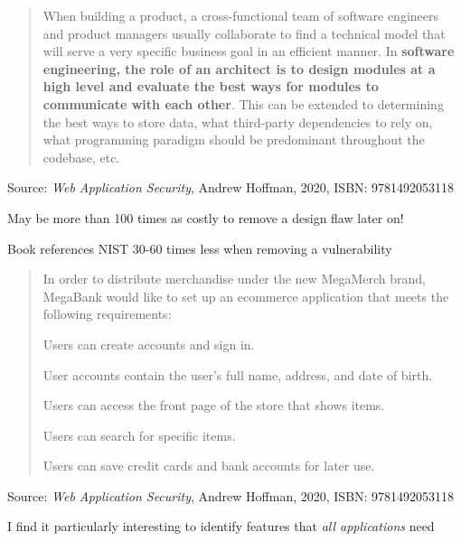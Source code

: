 \documentclass[Screen16to9,17pt]{foils}
\begin{document}





\begin{quote}
When building a product, a cross-functional team of software engineers and product managers usually collaborate to find a technical model that will serve a very specific business goal in an efficient manner. In {\bf software engineering, the role of an architect is to design modules at a high level and evaluate the best ways for modules to communicate with each other}. This can be extended to determining the best ways to store data, what third-party dependencies to rely on, what programming paradigm should be predominant throughout the codebase, etc.
\end{quote}
Source: \emph{Web Application Security}, Andrew Hoffman, 2020, ISBN: 9781492053118

\begin{list2}
\item May be more than 100 times as costly to remove a design flaw later on!
\item Book references NIST 30-60 times less when removing a vulnerability
\end{list2}



\begin{quote}

In order to distribute merchandise under the new MegaMerch brand, MegaBank
would like to set up an ecommerce application that meets the following requirements:
\begin{list2}
\item Users can create accounts and sign in.
\item User accounts contain the user’s full name, address, and date of birth.
\item Users can access the front page of the store that shows items.
\item Users can search for specific items.
\item Users can save credit cards and bank accounts for later use.
\end{list2}
\end{quote}

Source: \emph{Web Application Security}, Andrew Hoffman, 2020, ISBN: 9781492053118

\begin{list2}
\item I find it particularly interesting to identify features that \emph{all applications} need
\end{list2}
\end{document}
